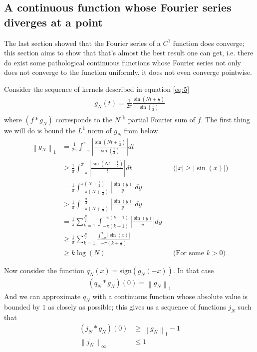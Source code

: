 \documentclass[12pt, titlepage]{article}
\theoremstyle{definition}
\newcommand{\norm}[1]{\left\lVert#1\right\rVert}
\begin{document}
\subsection{A continuous function whose Fourier series diverges at a point \cite{banach}}
The last section showed that the Fourier series of a $C^1$ function does converge; this section aims to show that that's almost the best result one can get, i.e. there do exist some pathological continuous functions whose Fourier series not only does not converge to the function uniformly, it does not even converge pointwise.

Consider the sequence of kernels described in equation \ref{eq:5}
\begin{align*}
    g_N(t) = \frac{1}{2\pi} \frac{\sin\left( Nt + \frac{t}{2} \right)}{\sin\left( \frac{t}{2} \right)}
\end{align*}
where $(f \ast g_N)$ corresponds to the $N$\textsuperscript{th} partial Fourier sum of $f$. The first thing we will do is bound the $L^1$ norm of $g_N$ from below.
\begin{align*}
    \norm{g_N}_1 &= \frac{1}{2\pi} \int_{-\pi}^{\pi} \left| \frac{\sin \left( Nt + \frac{t}{2} \right)}{\sin \left( \frac{t}{2} \right)} \right| dt \\
    &\geq \frac{1}{\pi} \int_{-\pi}^{\pi}\left| \frac{\sin \left( Nt + \frac{t}{2} \right)}{t} \right|dt &&\text{($|x| \geq |\sin(x)|$)} \\
    &= \frac{1}{\pi} \int_{-\pi\left( N+\frac{1}{2} \right)}^{\pi\left( N+\frac{1}{2} \right)} \left| \frac{\sin(y)}{y} \right| dy \\
    &> \frac{1}{\pi} \int_{-\pi\left( N+\frac{1}{2} \right)}^{-\frac{\pi}{2}} \left| \frac{\sin(y)}{y} \right| dy \\
    &= \frac{1}{\pi} \sum_{k=1}^{\frac{N}{2}} \int_{-\pi\left( k +1 \right)}^{-\pi\left( k - 1 \right)} \left| \frac{\sin(y)}{y} \right| dy \\
    &\geq \frac{1}{\pi} \sum_{k=1}^{\frac{N}{2}} \frac{\int_{-\pi}^{\pi} |\sin(x)|}{-\pi\left( k + \frac{1}{2} \right)} \\
    &\geq k \log(N) &&\text{(For some $k>0$)}
\end{align*}

Now consider the function $q_N(x) = \mathrm{sign}(g_N(-x))$. In that case
\begin{align*}
    (q_N \ast g_N)(0) = \norm{g_N}_1
\end{align*}
And we can approximate $q_N$ with a continuous function whose absolute value is bounded by $1$ as closely as possible; this gives us a sequence of functions $j_N$ such that
\begin{align*}
    (j_N \ast g_N)(0) &\geq \norm{g_N}_1 - 1 \\
    \norm{j_N}_\infty &\leq 1
\end{align*}
\end{document}

